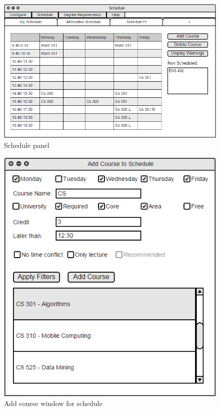 \documentclass[twoside,letterpaper]{article}
\begin{document}
\begin{figure}[h!]
\centering
\includegraphics[keepaspectratio, scale=0.6]{Mockups/schedule.png}
\caption{Schedule panel}
\label{fig:mockupSchedule}
\end{figure}

\begin{figure}[h!]
\centering
\includegraphics[keepaspectratio, scale=0.45]{Mockups/addCourseSchedule.png}
\caption{Add course window for schedule}
\label{fig:mockupScheduleAdd}
\end{figure}
\end{document}
